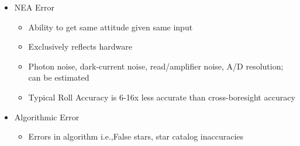 \begin{itemize}
\begin{itemize}
\begin{itemize}
        \end{itemize} 
    \end{itemize}
    \begin{itemize}
        \item NEA Error 
        \begin{itemize}
            \item Ability to get same attitude given same input
            \item Exclusively reflects hardware
            \item Photon noise, dark-current noise, read/amplifier noise, A/D resolution; can be estimated
            \item Typical Roll Accuracy is 6-16x less accurate than cross-boresight accuracy
        \end{itemize}
    \end{itemize}
    \begin{itemize}
        \item Algorithmic Error
        \begin{itemize}
            \item Errors in algorithm i.e.,False stars, star catalog inaccuracies
        \end{itemize} 
    \end{itemize}
\end{itemize}